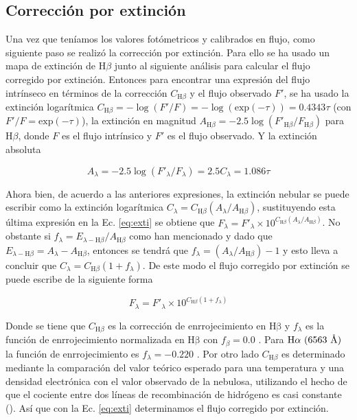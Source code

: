 \subsection{Corrección por extinción}
\label{sec:extintion}

Una vez que teníamos los valores fotómetricos y calibrados en flujo, como siguiente paso se realizó la corrección por extinción. Para ello se ha usado un mapa de extinción de \(\text{H}\beta\) junto al siguiente análisis para calcular el flujo corregido por extinción. Entonces para encontrar una expresión del flujo intrínseco en términos de la corrección \(C_{\text{H}\beta}\) y el flujo observado \(F'\), se ha usado la extinción logarítmica \(C_{\text{H}\beta} = -\log(F'/F) = -\log (\text{exp}(-\tau)) = 0.4343\tau\) (con \(F'/F = \text{exp}(-\tau)\)),  la extinción en magnitud \(A_{\text{H}\beta}=-2.5\log(F'_{\text{H}\beta}/F_{\text{H}\beta})\) para  \(\text{H}\beta\), donde  \(F\) es el flujo intrínsico y \(F'\) es el flujo observado. Y la extinción absoluta  

\begin{equation}
A_{\lambda}=-2.5\log(F'_{\lambda}/F_{\lambda})=2.5C_{\lambda}=1.086\tau
\label{eq:exti}
\end{equation}

Ahora bien, de acuerdo a las anteriores expresiones, la extinción nebular se puede escribir como la extinción logarítmica \(C_{\lambda} = C_{\text{H}\beta}(A_{\lambda}/A_{\text{H}\beta})\), sustituyendo esta última expresión en la Ec. \ref{eq:exti} se obtiene que  \(F_{\lambda} = F'_{\lambda}\times10^{C_{\text{H}\beta}(A_{\lambda}/A_{\text{H}\beta})}\). No obstante si  \(f_{\lambda}= E_{\lambda-\text{H}\beta}/A_{\text{H}\beta}\) como han mencionado \citet{Costero:1970} y dado que \(E_{\lambda-\text{H}\beta}=A_{\lambda}-A_{\text{H}\beta}\), entonces se tendrá que \(f_{\lambda} = (A_{\lambda}/A_{\text{H}\beta})-1\) y esto lleva a concluir que \(C_{\lambda}= C_{\text{H}\beta}(1+f_{\lambda})\). De este modo el flujo corregido por extinción se puede escribe de la siguiente forma

\begin{equation}
  \label{eq:flujo}
  F_{\lambda} = F'_{\lambda}\times10^{C_{\text{H}\beta}(1+f_{\lambda})}
\end{equation}

 Donde se tiene que \(C_{\text{H}\beta}\) es la corrección de enrrojecimiento en \(\mathrm{H\beta}\) y \(f_{\lambda}\) es la función de enrrojecimiento normalizada en \(\mathrm{H\beta}\) con \(f_{\beta}=0.0\) \citep{Peimbert:1977}. Para \(\mathrm{H}\alpha{}~(6563~\text{\AA{}}{})\) la función de enrrojecimiento es \(f_{\lambda} = -0.220\) \citep{Blagrave:2007}. Por otro lado \(C_{\text{H}\beta}\) es determinado mediante la comparación del valor teórico esperado para una temperatura y una densidad electrónica con el valor observado de la nebulosa, utilizando el hecho de que el cociente entre dos líneas de recombinación de hidrógeno es casi constante (\citeauthor{Peimbert:1977}). Así que con la Ec. \ref{eq:exti} determinamos el flujo corregido por extinción.

